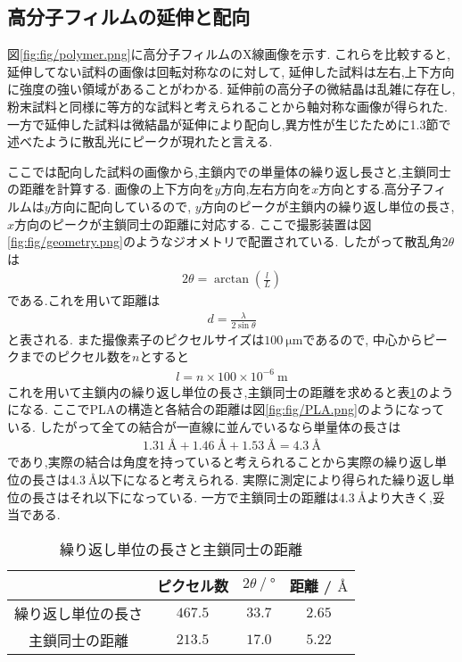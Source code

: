 \subsection{高分子フィルムの延伸と配向}
図\ref{fig:fig/polymer.png}に高分子フィルムのX線画像を示す.
これらを比較すると,延伸してない試料の画像は回転対称なのに対して,
延伸した試料は左右,上下方向に強度の強い領域があることがわかる.
延伸前の高分子の微結晶は乱雑に存在し,粉末試料と同様に等方的な試料と考えられることから軸対称な画像が得られた.
一方で延伸した試料は微結晶が延伸により配向し,異方性が生じたために1.3節で述べたように散乱光にピークが現れたと言える.

ここでは配向した試料の画像から,主鎖内での単量体の繰り返し長さと,主鎖同士の距離を計算する.
画像の上下方向を$y$方向,左右方向を$x$方向とする.高分子フィルムは$y$方向に配向しているので,
$y$方向のピークが主鎖内の繰り返し単位の長さ, $x$方向のピークが主鎖同士の距離に対応する.
ここで撮影装置は図\ref{fig:fig/geometry.png}のようなジオメトリで配置されている.
したがって散乱角$2\theta$は
\begin{align}
  2\theta=\arctan\left(\frac{l}{L}\right)
\end{align}
である.これを用いて距離は
\begin{align}
  d=\frac{\lambda}{2\sin\theta}
\end{align}
と表される.
また撮像素子のピクセルサイズは$100\ \si{\micro\metre}$であるので,
中心からピークまでのピクセル数を$n$とすると
\begin{align}
  l=n\times 100\times10^{-6}\ \si{\metre}
\end{align}
これを用いて主鎖内の繰り返し単位の長さ,主鎖同士の距離を求めると表\ref{tab:koubunsi}のようになる.
ここでPLAの構造と各結合の距離は図\ref{fig:fig/PLA.png}のようになっている.
したがって全ての結合が一直線に並んでいるなら単量体の長さは
\begin{align}
  1.31\ \si{\angstrom}+1.46\ \si{\angstrom}+1.53\ \si{\angstrom}=4.3\ \si{\angstrom}
\end{align}
であり,実際の結合は角度を持っていると考えられることから実際の繰り返し単位の長さは$4.3\ \si{\angstrom}$以下になると考えられる.
実際に測定により得られた繰り返し単位の長さはそれ以下になっている.
一方で主鎖同士の距離は$4.3\ \si{\angstrom}$より大きく,妥当である.
\begin{table}[h]
  \caption{繰り返し単位の長さと主鎖同士の距離}
  \label{tab:koubunsi}
  \centering
  \begin{tabular}{cccc}
  \hline
  &ピクセル数&$2\theta\ /\ \si{\degree}$&距離 / $\si{\angstrom}$\\
  \hline \hline
  繰り返し単位の長さ&$467.5$&$33.7$&$2.65$\\
  主鎖同士の距離&$213.5$&$17.0$&$5.22$\\
  \hline
  \end{tabular}
\end{table}
